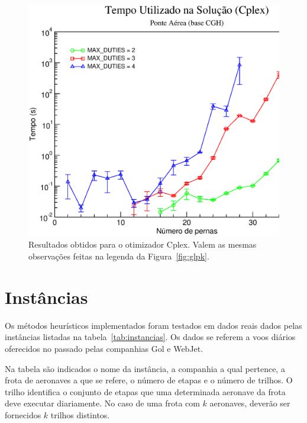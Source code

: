 \begin{figure}[htb]
	\begin{center}
		\includegraphics[scale=0.45,angle=0]{fig/cplex_solution_time.eps}
		\caption{Resultados obtidos para o otimizador Cplex. Valem as mesmas observações feitas na 
		legenda da Figura~\ref{fig:glpk}.}
		\label{fig:cplex}
	\end{center}
\end{figure}


\section{Instâncias}
\label{sec:instancias}

Os métodos heurísticos implementados foram testados em dados reais dados pelas instâncias listadas
na tabela~\ref{tab:instancias}. Os dados se referem a voos diários oferecidos no passado pelas
companhias Gol e WebJet. 

Na tabela são indicados o nome da instância, a companhia a qual pertence, a frota de aeronaves a que
se refere, o número de etapas e o número de trilhos. O trilho identifica o conjunto de etapas que
uma determinada aeronave da frota deve executar diariamente. No caso de uma frota com $k$ aeronaves,
deverão ser fornecidos $k$ trilhos distintos.

